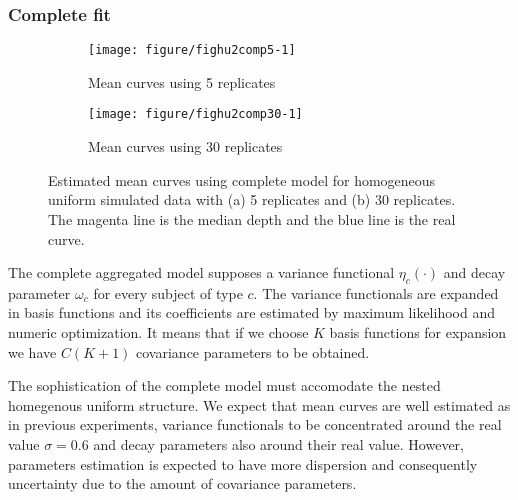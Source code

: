 \subsubsection{Complete fit}
\label{sec:hu2comp}





\begin{figure}[!t]
  \centering
  \begin{subfigure}{\textwidth}
    \centering
\begin{knitrout}
\color{fgcolor}
\texttt{[image: figure/fighu2comp5-1]} 

\end{knitrout}
    \caption{Mean curves using 5 replicates}
  \end{subfigure}
  \begin{subfigure}{\textwidth}
    \centering
\begin{knitrout}
\color{fgcolor}
\texttt{[image: figure/fighu2comp30-1]} 

\end{knitrout}
    \caption{Mean curves using 30 replicates}
  \end{subfigure}
  \caption{Estimated mean curves using complete model for homogeneous uniform simulated data with (a) 5 replicates and (b) 30 replicates. The magenta line is the median depth and the blue line is the real curve.}
  \label{fig:mpchu2comp}
\end{figure}


The complete aggregated model supposes a variance functional $\eta_c(\cdot)$ and decay parameter $\omega_c$ for every subject of type $c$. The variance functionals are expanded in basis functions and its coefficients are estimated by maximum likelihood and numeric optimization. It means that if we choose $K$ basis functions for expansion we have $C(K+1)$ covariance parameters to be obtained.

The sophistication of the complete model must accomodate the nested homegenous uniform structure. We expect that mean curves are well estimated as in previous experiments, variance functionals to be concentrated around the real value $\sigma=0.6$ and decay parameters also around their real value. However, parameters estimation is expected to have more dispersion and consequently uncertainty due to the amount of covariance parameters.


